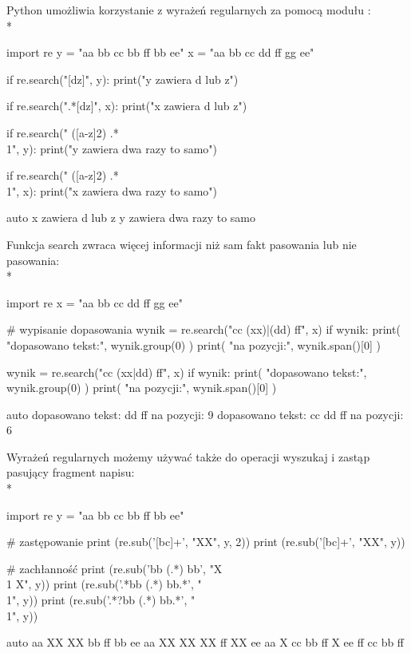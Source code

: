 \noindent
Python umożliwia korzystanie z wyrażeń regularnych za pomocą modułu :
\\*
\begin{CodeFrame}[python]{0.57\textwidth}
import re
y = "aa bb cc bb ff bb ee"
x = "aa bb cc dd ff gg ee"

if re.search("[dz]", y):
  print("y zawiera d lub z")

if re.search(".*[dz]", x):
  print("x zawiera d lub z")

if re.search(" ([a-z]{2}) .* \\1", y):
  print("y zawiera dwa razy to samo")

if re.search(" ([a-z]{2}) .* \\1", x):
  print("x zawiera dwa razy to samo")
\end{CodeFrame}
\begin{CodeFrame}{auto}
x zawiera d lub z
y zawiera dwa razy to samo
\end{CodeFrame}

\noindent
Funkcja search zwraca więcej informacji niż sam fakt pasowania lub nie pasowania:
\\*
\begin{CodeFrame}[python]{0.57\textwidth}
import re
x = "aa bb cc dd ff gg ee"

# wypisanie dopasowania
wynik = re.search("cc (xx)|(dd) ff", x)
if wynik:
  print( "dopasowano tekst:", wynik.group(0) )
  print( "na pozycji:", wynik.span()[0] )

wynik = re.search("cc (xx|dd) ff", x)
if wynik:
  print( "dopasowano tekst:", wynik.group(0) )
  print( "na pozycji:", wynik.span()[0] )
\end{CodeFrame}
\begin{CodeFrame}{auto}
dopasowano tekst: dd ff
na pozycji: 9
dopasowano tekst: cc dd ff
na pozycji: 6
\end{CodeFrame}

\noindent
Wyrażeń regularnych możemy używać także do operacji wyszukaj i zastąp pasujący fragment napisu:
\\*
\begin{CodeFrame}[python]{0.57\textwidth}
import re
y = "aa bb cc bb ff bb ee"

# zastępowanie
print (re.sub('[bc]+', "XX", y, 2))
print (re.sub('[bc]+', "XX", y))

# zachłanność
print (re.sub('bb (.*) bb', "X \\1 X", y))
print (re.sub('.*bb (.*) bb.*', "\\1", y))
print (re.sub('.*?bb (.*) bb.*', "\\1", y))
\end{CodeFrame}
\begin{CodeFrame}{auto}
aa XX XX bb ff bb ee
aa XX XX XX ff XX ee
aa X cc bb ff X ee
ff
cc bb ff
\end{CodeFrame}

